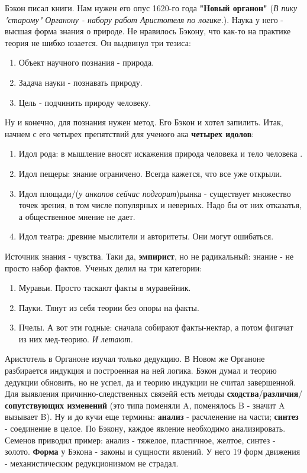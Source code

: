 Бэкон писал книги. Нам нужен его опус 1620-го года \textbf{"Новый органон"} (\textit{В пику "старому" Органону - набору работ Аристотеля по логике.}). Наука у него - высшая форма знания о природе.
Не нравилось Бэкону, что как-то на практике теория не шибко юзается.  Он выдвинул три тезиса:
\begin{enumerate}
\item Объект научного познания - природа.
\item Задача науки - познавать природу.
\item Цель - подчинить природу человеку.
\end{enumerate}
Ну и конечно, для познания нужен метод. Его Бэкон и хотел запилить. Итак, начнем с его четырех препятствий для ученого ака \textbf{четырех идолов}:
\begin{enumerate}
\item Идол рода: в мышление вносят искажения природа человека и тело человека . 
\item Идол пещеры: знание ограничено. Всегда кажется, что все уже открыли.
\item Идол площади/(\textit{у анкапов сейчас подгорит})рынка - существует множество точек зрения, в том числе популярных и неверных. Надо бы  от них отказатья, а общественное мнение не дает.
\item Идол театра: древние мыслители и авторитеты. Они могут ошибаться.
\end{enumerate}

Источник знания - чувства. Таки да, \textbf{эмпирист}, но не радикальный: знание - не просто набор фактов. Ученых делил на три категории:
\begin{enumerate}
\item Муравьи. Просто таскают факты в муравейник.
\item Пауки. Тянут из себя теории без опоры на факты.
\item Пчелы. А вот эти годные: сначала собирают факты-нектар, а потом фигачат из них мед-теорию. \textit{И летают.}
\end{enumerate}

Аристотель в Органоне изучал только дедукцию. В Новом же Органоне разбирается индукция и построенная на ней логика. Бэкон думал и теорию дедукции обновить, но не успел, да и теорию индукции не считал завершенной. Для выявления причинно-следственных связейй есть методы \textbf{сходства}/\textbf{различия}/\textbf{сопутствующих изменений} (это типа поменяли A, поменялось B - значит A вызывает B). Ну и до кучи еще термины: \textbf{анализ} - расчленение на части; \textbf{синтез} - соединение в целое. По Бэкону, каждое явление необходимо анализировать. Семенов приводил пример: анализ - тяжелое, пластичное, желтое, синтез - золото. \textbf{Форма} у Бэкона - законы и сущности явлений. У него 19 форм движения - механистическим редукционизмом не страдал.

